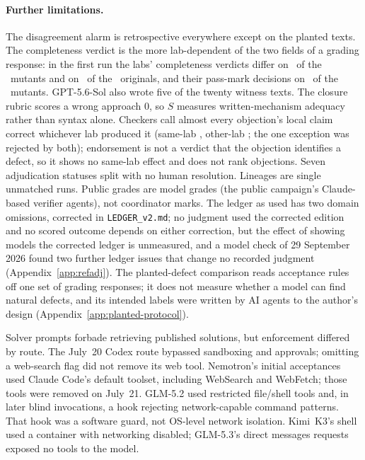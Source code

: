 \paragraph{Further limitations.} The disagreement alarm is retrospective everywhere except on the planted texts. The completeness verdict is the more lab-dependent of the two fields of a grading response: in the first run the labs' completeness verdicts differ on \CRLabFlagDiffMutP\ of the \CRNMutants\ mutants and on \CRLabFlagDiffOrigP\ of the \CRNPerClass\ originals, and their pass-mark decisions on \CRLabPassDiffMutP\ of the \CRNMutants\ mutants. GPT-5.6-Sol also wrote five of the twenty witness texts. The closure rubric scores a wrong approach $0$, so $S$ measures written-mechanism adequacy rather than syntax alone. Checkers call almost every objection's local claim correct whichever lab produced it (same-lab \REFADJENDORSESAME, other-lab \REFADJENDORSEOTHER; the one exception was rejected by both); endorsement is not a verdict that the objection identifies a defect, so it shows no same-lab effect and does not rank objections. Seven adjudication statuses split with no human resolution. Lineages are single unmatched runs. Public grades are model grades (the public campaign's Claude-based verifier agents), not coordinator marks. The ledger as used has two domain omissions, corrected in \texttt{LEDGER\_v2.md}; no judgment used the corrected edition and no scored outcome depends on either correction, but the effect of showing models the corrected ledger is unmeasured, and a model check of 29 September 2026 found two further ledger issues that change no recorded judgment (Appendix~\ref{app:refadj}). The planted-defect comparison reads acceptance rules off one set of grading responses; it does not measure whether a model can find natural defects, and its intended labels were written by AI agents to the author's design (Appendix~\ref{app:planted-protocol}).

Solver prompts forbade retrieving published solutions, but enforcement differed by route. The July~20 Codex route bypassed sandboxing and approvals; omitting a web-search flag did not remove its web tool. Nemotron's initial acceptances used Claude Code's default toolset, including WebSearch and WebFetch; those tools were removed on July~21. GLM-5.2 used restricted file/shell tools and, in later blind invocations, a hook rejecting network-capable command patterns. That hook was a software guard, not OS-level network isolation. Kimi~K3's shell used a container with networking disabled; GLM-5.3's direct messages requests exposed no tools to the model.

